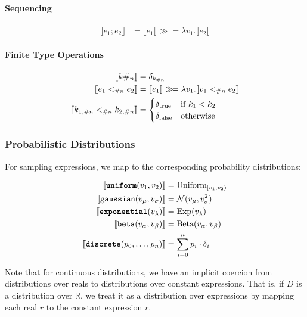 \paragraph{Sequencing}
\begin{align*}
\llbracket e_1; e_2 \rrbracket &= \llbracket e_1 \rrbracket \gg\!= \lambda v_1. \llbracket e_2 \rrbracket
\end{align*}

\paragraph{Finite Type Operations}
\begin{align*}
\llbracket k\#_{n} \rrbracket &= \delta_{k_{\#n}} \\
\llbracket e_1 <_{\#{n}} e_2 \rrbracket &= \llbracket e_1 \rrbracket \gg\!= \lambda v_1. \llbracket v_1 <_{\#{n}} e_2 \rrbracket \\
\llbracket k_{1,\#n} <_{\#{n}} k_{2,\#n} \rrbracket &= \begin{cases}
    \delta_{\text{true}} & \text{if } k_1 < k_2 \\
    \delta_{\text{false}} & \text{otherwise}
\end{cases}
\end{align*}

\subsubsection{Probabilistic Distributions}

For sampling expressions, we map to the corresponding probability distributions:

\begin{align*}
\llbracket \text{\ttfamily\bfseries uniform}(v_1, v_2) \rrbracket &= \text{Uniform}_{[v_1, v_2)} \\
\llbracket \text{\ttfamily\bfseries gaussian}(v_\mu, v_\sigma) \rrbracket &= \mathcal{N}(v_\mu, v_\sigma^2) \\
\llbracket \text{\ttfamily\bfseries exponential}(v_\lambda) \rrbracket &= \text{Exp}(v_\lambda) \\
\llbracket \text{\ttfamily\bfseries beta}(v_\alpha, v_\beta) \rrbracket &= \text{Beta}(v_\alpha, v_\beta) \\
\llbracket \text{\ttfamily\bfseries discrete}(p_0, \ldots, p_n) \rrbracket &= \sum_{i=0}^n p_i \cdot \delta_i
\end{align*}

Note that for continuous distributions, we have an implicit coercion from distributions over reals to distributions over constant expressions. That is, if $D$ is a distribution over $\mathbb{R}$, we treat it as a distribution over expressions by mapping each real $r$ to the constant expression $r$.

